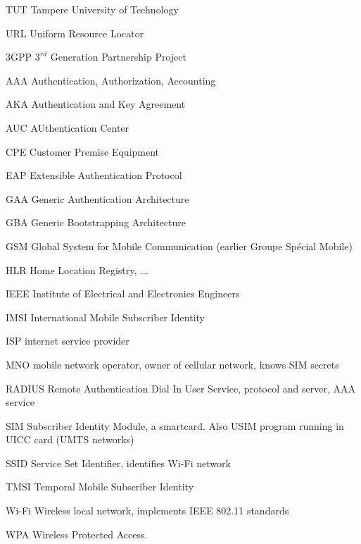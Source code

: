 \documentclass[12pt,a4paper,english]{tutthesis}
\begin{document}
\begin{otherlanguage}{english}
\begin{termlist}
\item [TUT]    Tampere University of Technology
\item [URL]    Uniform Resource Locator
\item[3GPP] $3^{rd}$ Generation Partnership Project
\item[AAA] Authentication, Authorization, Accounting
\item[AKA] Authentication and Key Agreement %
\item[AUC] AUthentication Center
\item[CPE] Customer Premise Equipment %
\item[EAP] Extensible Authentication Protocol %
\item[GAA] Generic Authentication Architecture %
\item[GBA] Generic Bootstrapping Architecture
\item[GSM] Global System for Mobile Communication (earlier Groupe Spécial Mobile)
\item[HLR] Home Location Registry, ...
\item[IEEE] Institute of Electrical and Electronics Engineers
\item[IMSI] International Mobile Subscriber Identity
\item[ISP] internet service provider
\item[MNO] mobile network operator, owner of cellular network, knows SIM secrets
\item[RADIUS] Remote Authentication Dial In User Service, protocol and server,  AAA service 
\item[SIM]  Subscriber Identity Module, a smartcard. Also USIM program running in UICC card (UMTS networks)
\item[SSID] Service Set Identifier, identifies Wi-Fi network
\item[TMSI] Temporal Mobile Subscriber Identity
\item[Wi-Fi] Wireless local network, implements IEEE 802.11 standards
\item[WPA] Wireless Protected Access.
\end{termlist} 



\end{otherlanguage}
\end{document}
